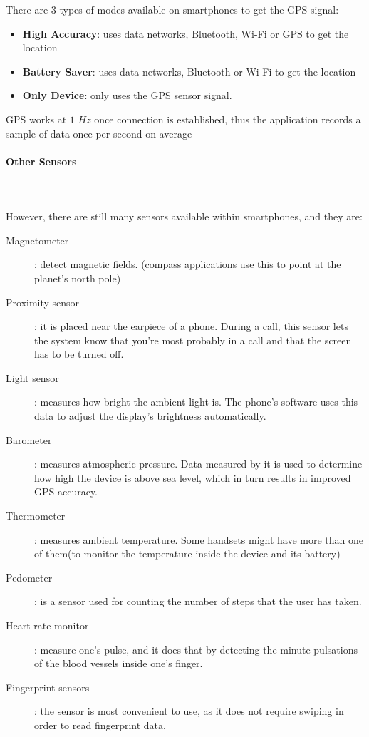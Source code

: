 \documentclass{standalone}
\begin{document}
There are 3 types of modes available on smartphones to get the GPS signal: 
\begin{itemize}
\item \textbf{High Accuracy}: uses data networks, Bluetooth, Wi-Fi or GPS to get the location
\item \textbf{Battery Saver}: uses data networks, Bluetooth or Wi-Fi to get the location
\item \textbf{Only Device}:  only uses the GPS sensor signal.
\end{itemize}

\noindent GPS works at $1$ $Hz$ once connection is established, thus the application records a sample of data once per second on average




\clearpage
\paragraph{{\Large Other Sensors}}\leavevmode\\\\
However, there are still many sensors available within smartphones, and they are:
\begin{description}
\item[Magnetometer]: detect magnetic fields. (compass applications use this to point at the planet's north pole)
\item[Proximity sensor]: it is placed near the earpiece of a phone. During a call, this sensor lets the system know that you're most probably in a call and that the screen has to be turned off.
\item[Light sensor]: measures how bright the ambient light is. The phone's software uses this data to adjust the display's brightness automatically.
\item[Barometer]: measures atmospheric pressure. Data measured by it is used to determine how high the device is above sea level, which in turn results in improved GPS accuracy. 
\item[Thermometer]: measures ambient temperature. Some handsets might have more than one of them(to monitor the temperature inside the device and its battery)
\item[Pedometer]: is a sensor used for counting the number of steps that the user has taken.
\item[Heart rate monitor]: measure one's pulse, and it does that by detecting the minute pulsations of the blood vessels inside one's finger.
\item[Fingerprint sensors]: the sensor is most convenient to use, as it does not require swiping in order to read fingerprint data.
\end{description}
\clearpage
\end{document}
